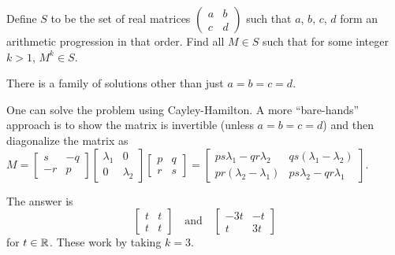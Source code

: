 \begin{problem}
	[Putnam 2015]
	\yod
	Define $S$ to be the set of real matrices 
	$\left(\begin{smallmatrix} a & b \\ c & d \end{smallmatrix}\right)$
	such that $a$, $b$, $c$, $d$ form
	an arithmetic progression in that order.
	Find all $M \in S$ such that for some integer $k > 1$, $M^k \in S$.
	\begin{hint}
		There is a family of solutions other than just $a=b=c=d$.

		One can solve the problem using Cayley-Hamilton.
		A more ``bare-hands'' approach is to
		show the matrix is invertible (unless $a=b=c=d$)
		and then diagonalize the matrix as
		$
		M =
		\begin{bmatrix} s & -q \\ -r & p \end{bmatrix}
		\begin{bmatrix} \lambda_1 & 0 \\ 0 & \lambda_2 \end{bmatrix}
		\begin{bmatrix} p & q \\ r & s \end{bmatrix}
		=
		\begin{bmatrix} 
			ps\lambda_1 - qr\lambda_2 & qs(\lambda_1-\lambda_2) \\
			pr(\lambda_2-\lambda_1) & ps\lambda_2 - qr\lambda_1
		\end{bmatrix} 
		$.
	\end{hint}
	\begin{sol}
		The answer is 
		\[ \begin{bmatrix} t&t\\t&t \end{bmatrix}
			\quad\text{and}\quad 
			\begin{bmatrix} -3t&-t\\t&3t \end{bmatrix} \]
		for $t \in \mathbb R$.
		These work by taking $k=3$.


\end{sol}
\end{problem}
